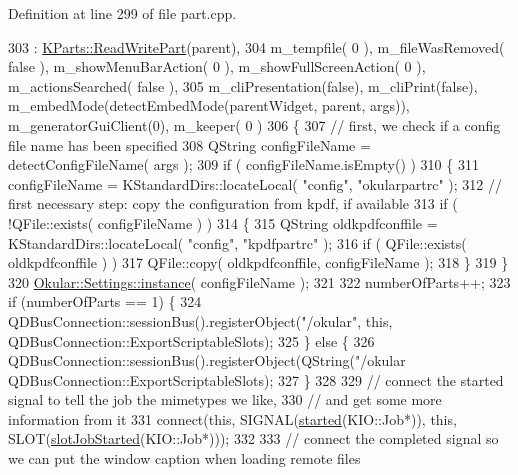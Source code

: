 Definition at line 299 of file part.\+cpp.


\begin{DoxyCode}
303 : \hyperlink{classKParts_1_1ReadWritePart}{KParts::ReadWritePart}(parent),
304 m\_tempfile( 0 ), m\_fileWasRemoved( \textcolor{keyword}{false} ), m\_showMenuBarAction( 0 ), m\_showFullScreenAction( 0 ), 
      m\_actionsSearched( \textcolor{keyword}{false} ),
305 m\_cliPresentation(\textcolor{keyword}{false}), m\_cliPrint(\textcolor{keyword}{false}), m\_embedMode(detectEmbedMode(parentWidget, parent, args)), 
      m\_generatorGuiClient(0), m\_keeper( 0 )
306 \{
307     \textcolor{comment}{// first, we check if a config file name has been specified}
308     QString configFileName = detectConfigFileName( args );
309     \textcolor{keywordflow}{if} ( configFileName.isEmpty() )
310     \{
311         configFileName = KStandardDirs::locateLocal( \textcolor{stringliteral}{"config"}, \textcolor{stringliteral}{"okularpartrc"} );
312         \textcolor{comment}{// first necessary step: copy the configuration from kpdf, if available}
313         \textcolor{keywordflow}{if} ( !QFile::exists( configFileName ) )
314         \{
315             QString oldkpdfconffile = KStandardDirs::locateLocal( \textcolor{stringliteral}{"config"}, \textcolor{stringliteral}{"kpdfpartrc"} );
316             \textcolor{keywordflow}{if} ( QFile::exists( oldkpdfconffile ) )
317                 QFile::copy( oldkpdfconffile, configFileName );
318         \}
319     \}
320     \hyperlink{classOkular_1_1Settings_abbb545088027d7de160764628c19a616}{Okular::Settings::instance}( configFileName );
321     
322     numberOfParts++;
323     \textcolor{keywordflow}{if} (numberOfParts == 1) \{
324         QDBusConnection::sessionBus().registerObject(\textcolor{stringliteral}{"/okular"}, \textcolor{keyword}{this}, 
      QDBusConnection::ExportScriptableSlots);
325     \} \textcolor{keywordflow}{else} \{
326         QDBusConnection::sessionBus().registerObject(QString(\textcolor{stringliteral}{"/okular%
      QDBusConnection::ExportScriptableSlots);
327     \}
328 
329     \textcolor{comment}{// connect the started signal to tell the job the mimetypes we like,}
330     \textcolor{comment}{// and get some more information from it}
331     connect(\textcolor{keyword}{this}, SIGNAL(\hyperlink{classKParts_1_1ReadOnlyPart_a1839e6f2741b7fca77cd4b04b5acdc6d}{started}(KIO::Job*)), \textcolor{keyword}{this}, SLOT(\hyperlink{classOkular_1_1Part_a995f0f59f0b748037f1680210fe9801b}{slotJobStarted}(KIO::Job*)));
332 
333     \textcolor{comment}{// connect the completed signal so we can put the window caption when loading remote files}
}
\end{DoxyCode}
